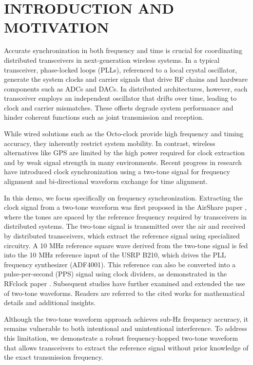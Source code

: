 \documentclass[conference]{IEEEtran}
\begin{document}
\section{INTRODUCTION AND MOTIVATION}
Accurate synchronization in both frequency and time is crucial for coordinating distributed transceivers in next-generation wireless systems. In a typical transceiver, phase-locked loops (PLLs), referenced to a local crystal oscillator, generate the system clocks and carrier signals that drive RF chains and hardware components such as ADCs and DACs. In distributed architectures, however, each transceiver employs an independent oscillator that drifts over time, leading to clock and carrier mismatches. These offsets degrade system performance and hinder coherent functions such as joint transmission and reception.

While wired solutions such as the Octo-clock provide high frequency and timing accuracy, they inherently restrict system mobility. In contrast, wireless alternatives like GPS are limited by the high power required for clock extraction and by weak signal strength in many environments. Recent progress in research have introduced clock synchronization using a two-tone signal for frequency alignment and bi-directional waveform exchange for time alignment.

In this demo, we focus specifically on frequency synchronization. Extracting the clock signal from a two-tone waveform was first proposed in the AirShare paper \cite{7218555}, where the tones are spaced by the reference frequency required by transceivers in distributed systems. The two-tone signal is transmitted over the air and received by distributed transceivers, which extract the reference signal using specialized circuitry. A 10 MHz reference square wave derived from the two-tone signal is fed into the 10 MHz reference input of the USRP B210, which drives the PLL frequency synthesizer (ADF4001). This reference can also be converted into a pulse-per-second (PPS) signal using clock dividers, as demonstrated in the RFclock paper \cite{10.1145/3447993.3448623}. Subsequent studies have further examined and extended the use of two-tone waveforms. Readers are referred to the cited works for mathematical details and additional insights.

Although the two-tone waveform approach achieves sub-Hz frequency accuracy, it remains vulnerable to both intentional and unintentional interference. To address this limitation, we demonstrate a robust frequency-hopped two-tone waveform that allows transceivers to extract the reference signal without prior knowledge of the exact transmission frequency.
\end{document}
